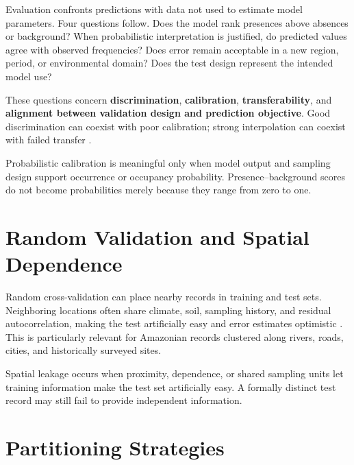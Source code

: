 Evaluation confronts predictions with data not used to estimate model
parameters. Four questions follow. Does the model rank presences above absences
or background? When probabilistic interpretation is justified, do predicted
values agree with observed frequencies? Does error remain acceptable in a new
region, period, or environmental domain? Does the test design represent the
intended model use?

These questions concern \textbf{discrimination}, \textbf{calibration},
\textbf{transferability}, and \textbf{alignment between validation design and
prediction objective}. Good discrimination can coexist with poor calibration;
strong interpolation can coexist with failed transfer
\parencite{vaughan2005testing,jimenezvalverde2013discrimination,roberts2017crossvalidation}.

\begin{atencao}[title={\faExclamationTriangle\quad Suitability is not automatically probability}]
Probabilistic calibration is meaningful only when model output and sampling
design support occurrence or occupancy probability. Presence--background scores
do not become probabilities merely because they range from zero to one.
\end{atencao}

\section{Random Validation and Spatial Dependence}

Random cross-validation can place nearby records in training and test sets.
Neighboring locations often share climate, soil, sampling history, and residual
autocorrelation, making the test artificially easy and error estimates
optimistic \parencite{roberts2017crossvalidation}. This is particularly relevant
for Amazonian records clustered along rivers, roads, cities, and historically
surveyed sites.

\begin{conceito}[title={\faBook\quad Spatial leakage}]
Spatial leakage occurs when proximity, dependence, or shared sampling units let
training information make the test set artificially easy. A formally distinct
test record may still fail to provide independent information.
\end{conceito}

\section{Partitioning Strategies}


